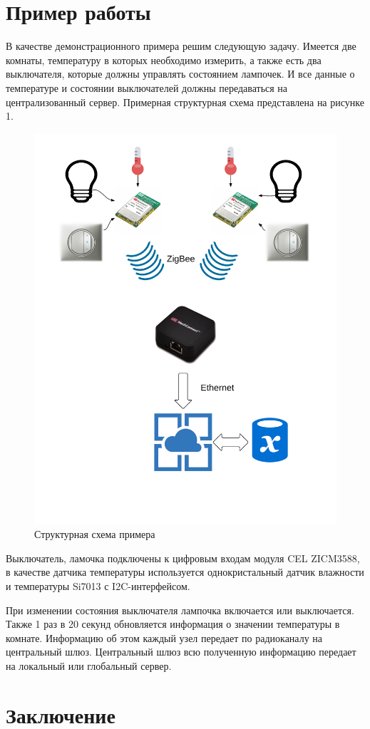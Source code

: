 \documentclass[12pt]{article}
\begin{document}
\section{Пример работы}
В качестве демонстрационного примера решим следующую задачу. Имеется две комнаты,
температуру в которых необходимо измерить, а также есть два выключателя, которые
должны управлять состоянием лампочек. И все данные о температуре и состоянии
выключателей должны передаваться на централизованный сервер. Примерная структурная
схема представлена на рисунке 1.
\begin{figure}[h!]
    \centering
    \includegraphics[scale=0.5]{cel-structure.png}
    \caption{Структурная схема примера}
\end{figure}

Выключатель, ламочка подключены к цифровым входам модуля CEL ZICM3588, в качестве
датчика температуры используется однокристальный датчик влажности и температуры
Si7013 с I2C-интерфейсом.

При изменении состояния выключателя лампочка включается или выключается. Также 1 раз в 20
секунд обновляется информация о значении температуры в комнате. Информацию об этом
каждый узел передает по радиоканалу на центральный шлюз. Центральный шлюз всю
полученную информацию передает на локальный или глобальный сервер.

\section{Заключение}
\end{document}
